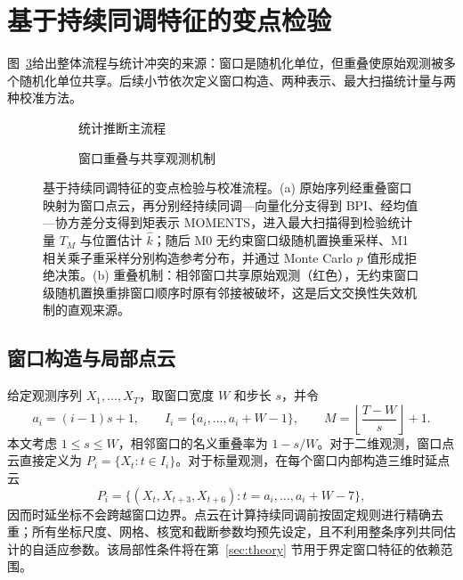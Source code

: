 \section{基于持续同调特征的变点检验}\label{sec:method}

图~\ref{fig:flow}给出整体流程与统计冲突的来源：窗口是随机化单位，但重叠使原始观测被多个随机化单位共享。后续小节依次定义窗口构造、两种表示、最大扫描统计量与两种校准方法。

\begin{figure}[tbp]
\centering
\begin{subfigure}[t]{0.92\linewidth}
\centering
\caption{统计推断主流程}\label{fig:flow-a}

\end{subfigure}

\vspace{1.2em}

\begin{subfigure}[t]{0.85\linewidth}
\centering
\caption{窗口重叠与共享观测机制}\label{fig:flow-b}

\end{subfigure}

\caption{基于持续同调特征的变点检验与校准流程。(a) 原始序列经重叠窗口映射为窗口点云，再分别经持续同调—向量化分支得到 BPI、经均值—协方差分支得到矩表示 MOMENTS，进入最大扫描得到检验统计量 $T_M$ 与位置估计 $\hat k$；随后 M0 无约束窗口级随机置换重采样、M1 相关乘子重采样分别构造参考分布，并通过 Monte Carlo $p$ 值形成拒绝决策。(b) 重叠机制：相邻窗口共享原始观测（红色），无约束窗口级随机置换重排窗口顺序时原有邻接被破坏，这是后文交换性失效机制的直观来源。}\label{fig:flow}
\end{figure}

\subsection{窗口构造与局部点云}\label{sec:windows}

给定观测序列 $X_1,\ldots,X_T$，取窗口宽度 $W$ 和步长 $s$，并令
\begin{equation}\label{eq:windows}
 a_i=(i-1)s+1,\qquad
 I_i=\{a_i,\ldots,a_i+W-1\},\qquad
 M=\left\lfloor\frac{T-W}{s}\right\rfloor+1.
\end{equation}
本文考虑 $1\le s\le W$，相邻窗口的名义重叠率为 $1-s/W$。对于二维观测，窗口点云直接定义为 $P_i=\{X_t:t\in I_i\}$。对于标量观测，在每个窗口内部构造三维时延点云
\begin{equation}\label{eq:delay-cloud}
 P_i=\bigl\{(X_t,X_{t+3},X_{t+6}):t=a_i,\ldots,a_i+W-7\bigr\},
\end{equation}
因而时延坐标不会跨越窗口边界。点云在计算持续同调前按固定规则进行精确去重；所有坐标尺度、网格、核宽和截断参数均预先设定，且不利用整条序列共同估计的自适应参数。该局部性条件将在第~\ref{sec:theory} 节用于界定窗口特征的依赖范围。

